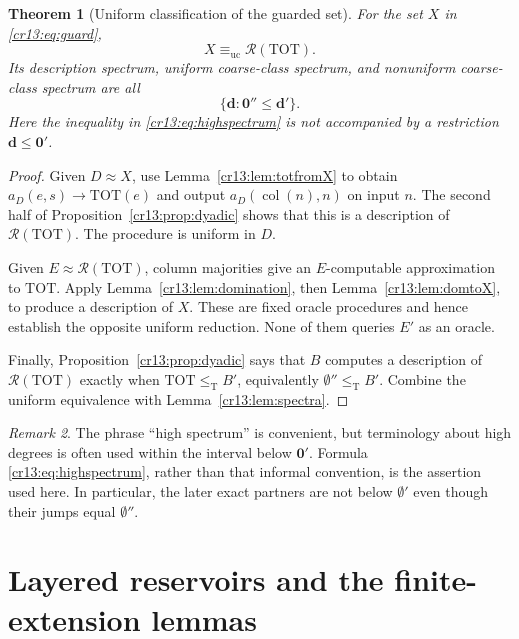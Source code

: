 \documentclass[11pt,letterpaper]{article}
\newtheorem{theorem}{Theorem}[section]
\theoremstyle{definition}
\theoremstyle{remark}\newtheorem{remark}[theorem]{Remark}
\numberwithin{equation}{section}
\newcommand{\leT}{\leq_{\mathrm T}}
\newcommand{\equc}{\equiv_{\mathrm{uc}}}
\newcommand{\TOT}{\mathrm{TOT}}
\newcommand{\Rc}{\mathcal R}
\newcommand{\col}{\operatorname{col}}
\newcommand{\zero}{\mathbf 0}
\begin{document}
\begin{theorem}[Uniform classification of the guarded set]\label{cr13:thm:classification}
For the set $X$ in \eqref{cr13:eq:guard},
\begin{equation}\label{cr13:eq:uniformclass}
                           X\equc\Rc(\TOT).
\end{equation}
Its description spectrum, uniform coarse-class spectrum, and nonuniform coarse-class spectrum are all
\begin{equation}\label{cr13:eq:highspectrum}
                  \{\mathbf d:\zero''\leq\mathbf d'\}.
\end{equation}
Here the inequality in \eqref{cr13:eq:highspectrum} is not accompanied by a restriction $\mathbf d\leq\zero'$.
\end{theorem}
\begin{proof}
Given $D\approx X$, use Lemma~\ref{cr13:lem:totfromX} to obtain $a_D(e,s)\to\TOT(e)$ and output $a_D(\col(n),n)$ on input $n$. The second half of Proposition~\ref{cr13:prop:dyadic} shows that this is a description of $\Rc(\TOT)$. The procedure is uniform in $D$.

Given $E\approx\Rc(\TOT)$, column majorities give an $E$-computable approximation to $\TOT$. Apply Lemma~\ref{cr13:lem:domination}, then Lemma~\ref{cr13:lem:domtoX}, to produce a description of $X$. These are fixed oracle procedures and hence establish the opposite uniform reduction. None of them queries $E'$ as an oracle.

Finally, Proposition~\ref{cr13:prop:dyadic} says that $B$ computes a description of $\Rc(\TOT)$ exactly when $\TOT\leT B'$, equivalently $\emptyset''\leT B'$. Combine the uniform equivalence with Lemma~\ref{cr13:lem:spectra}.
\end{proof}
\begin{remark}
The phrase ``high spectrum'' is convenient, but terminology about high degrees is often used within the interval below $\zero'$. Formula \eqref{cr13:eq:highspectrum}, rather than that informal convention, is the assertion used here. In particular, the later exact partners are not below $\emptyset'$ even though their jumps equal $\emptyset''$.
\end{remark}

\section{Layered reservoirs and the finite-extension lemmas}
\label{cr13:sec:reservoirs}
\end{document}
